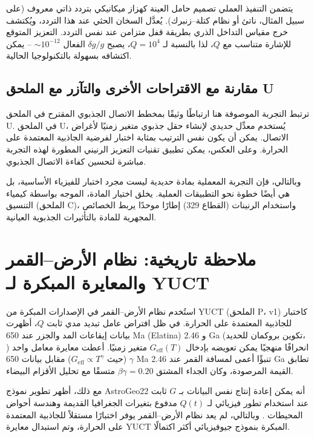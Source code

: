 \documentclass[11pt,a4paper]{article}
\begin{document}
	يتضمن التنفيذ العملي تصميم حامل العينة كهزاز ميكانيكي بتردد ذاتي معروف (على سبيل المثال، ناتئ أو نظام كتلة–زنبرك). يُعدَّل السخان الحثي عند هذا التردد، ويُكتشف خرج مقياس التداخل الذري بطريقة قفل متزامن عند نفس التردد. التعزيز المتوقع للإشارة متناسب مع $Q$، لذا بالنسبة لـ $Q = 10^4$، يصبح $\delta g/g$ الفعال $\sim 10^{-12}$ – يمكن اكتشافه بسهولة بالتكنولوجيا الحالية.
	
	\subsection{مقارنة مع الاقتراحات الأخرى والتآزر مع الملحق U}
	\label{subsec:comparison-appU}
	
	ترتبط التجربة الموصوفة هنا ارتباطًا وثيقًا بمخطط الاتصال الجذبوي المقترح في الملحق U. في الملحق U، يُستخدم معدِّل حديدي لإنشاء حقل جذبوي متغير زمنيًا لأغراض الاتصال. يمكن أن يكون نفس الترتيب بمثابة اختبار لفرضية الجاذبية المعتمدة على الحرارة. وعلى العكس، يمكن تطبيق تقنيات التعزيز الرنيني المطورة لهذه التجربة مباشرة لتحسين كفاءة الاتصال الجذبوي.
	
	وبالتالي، فإن التجربة المعملية بمادة حديدية ليست مجرد اختبار للفيزياء الأساسية، بل هي أيضًا خطوة نحو التطبيقات العملية. يخلق اختيار المادة، الموجه بواسطة كيمياء التنسيق (الملحق C)، واستخدام الرنينات (القطاع 329) إطارًا موحدًا يربط الخصائص المجهرية للمادة بالتأثيرات الجذبوية العيانية.
	
	\section{ملاحظة تاريخية: نظام الأرض–القمر والمعايرة المبكرة لـ YUCT}
	\label{sec:earth-moon}
	
	استُخدم نظام الأرض–القمر في الإصدارات المبكرة من YUCT (الملحق P، v1) كاختبار للجاذبية المعتمدة على الحرارة. في ظل افتراض عامل تبديد مدي ثابت $Q$، أظهرت بيانات إيقاعات المد والجزر عند 650 Ma (Elatina) و 2.46 Ga (تكوين بروكمان للحديد، \cite{Lantink2022}) انحرافًا منهجيًا يمكن تعويضه بإدخال $G_{\mathrm{eff}}(T)$ متغير زمنيًا. أعطت معايرة معامل واحد $\gamma$ (حيث $G_{\mathrm{eff}}\propto T^{\gamma}$) مقابل بيانات 650 Ma تنبؤًا أعمى لمسافة القمر عند 2.46 Ga تطابق القيمة المرصودة، وكان الجداء المشتق $\beta\gamma = 0.20$ متسقًا مع تحليل الأقزام البيضاء.
	
	مع ذلك، أظهر تطوير نموذج AstroGeo22 \cite{Farhat2022} أنه يمكن إعادة إنتاج نفس البيانات بـ $G$ ثابت عند استخدام تطور فيزيائي لـ $Q(t)$ مدفوع بتغيرات الجغرافيا القديمة وهندسة أحواض المحيطات \cite{Zeeden2023}. وبالتالي، لم يعد نظام الأرض–القمر يوفر اختبارًا مستقلاً للجاذبية المعتمدة على الحرارة، وتم استبدال معايرة YUCT المبكرة بنموذج جيوفيزيائي أكثر اكتمالًا.
	
\end{document}
